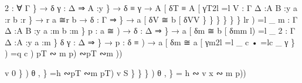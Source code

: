 \documentclass{acm_proc_article-sp}
\begin{document}
{\begin{code}
2 : ∀ \AgdaBound{\{}Γ \} → \AgdaBound{\{}δ γ : Δ ⇒ \AgdaBound{\{}A :y \} → δ ≡ γ → A [ δ\AgdaFunction{ ]}T ≡ A [ γ\AgdaFunction{ ]}T2l =l 
V : \AgdaBound{\{}Γ Δ :\AgdaBound{\{}A B :y \AgdaBound{\{}a :r \AgdaBound{\{}b :r \} →
    r a ≅r b → 
     \AgdaBound{\{}δ : Γ ⇒ \} 
     → a [ δ\AgdaFunction{ ]}V ≅ b [ δ\AgdaFunction{ ]}VV \AgdaBound{\{}\} \AgdaBound{\{}\} \AgdaSymbol{\{}\} \AgdaBound{\{}\} \AgdaSymbol{\{}\} \AgdaBound{\{}\} lr \AgdaSymbol{)}) =l \_
m : \AgdaBound{\{}Γ Δ :\AgdaBound{\{}A B :y \AgdaBound{\{}a :m \AgdaBound{\{}b :m \}
      \AgdaBound{(}p : a ≅ ) → 
      \AgdaBound{\{}δ : Δ ⇒ \}
      → a [ δ\AgdaFunction{ ]t}m ≅ b [ δ\AgdaFunction{ ]t}mm l\AgdaSymbol{ \_}) =l \_ 
2 : \AgdaBound{\{}Γ Δ :\AgdaBound{\{}A :y \AgdaBound{\{}a :m \}
          \AgdaBound{\{}δ γ : Δ ⇒ \} →
          \AgdaBound{(}p : δ ≡ )
        → a [ δ\AgdaFunction{ ]t}m ≅ a [ γ\AgdaFunction{ ]t}m2l =l \_
c • =lc \AgdaInductiveConstructor{(\_,}\_ γ \AgdaBound{\{}\} ) =q c ) 
    p\AgdaFunction{ [⊚]}T 
    ∾ m p\AgdaFunction{ [⊚]})
    ∾\AgdaSymbol{ (}p\AgdaFunction{ [⊚]}T 
    ∾m )\AgdaFunction{ -})

\AgdaFunction{
[⊚]}v 0 \} \AgdaBound{\{}) \AgdaBound{\{}θ , \}  =h ∾p\AgdaFunction{ [⊚]}T ∾m pT\AgdaFunction{ -}) \AgdaFunction{
[⊚]}v S \} \AgdaBound{\{}\} \AgdaBound{\{}\} ) \AgdaBound{\{}θ , \} = 
 h ∾ \AgdaFunction{([⊚]}v x ∾ m p)\AgdaFunction{ -})



\end{code}}
\end{document}
